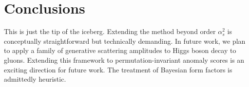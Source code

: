 \section{Conclusions}\label{sec:conclusions}

This is just the tip of the iceberg. Extending the method beyond order
$\alpha_s^2$ is conceptually straightforward but technically demanding.
In future work, we plan to apply a family of generative scattering
amplitudes to Higgs boson decay to gluons. Extending this framework to
permutation-invariant anomaly scores is an exciting direction for future
work. The treatment of Bayesian form factors is admittedly heuristic.

